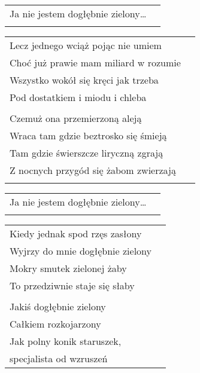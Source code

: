 \documentclass[a5paper]{article}
\begin{document}
\noindent
\begin{tabular}{@{}p{6.50cm}p{3cm}@{}}
Ja nie jestem dogłębnie zielony… \\ \\
\end{tabular}

\noindent
\begin{tabular}{@{}p{7.50cm}p{3cm}@{}}
Lecz jednego wciąż pojąc nie umiem \\
Choć już prawie mam miliard w rozumie \\
Wszystko wokół się kręci jak trzeba \\
Pod dostatkiem i miodu i chleba \\ \\

Czemuż ona przemierzoną aleją \\
Wraca tam gdzie beztrosko się śmieją \\
Tam gdzie świerszcze liryczną zgrają \\
Z nocnych przygód się żabom zwierzają \\ \\
\end{tabular}

\noindent
\begin{tabular}{@{}p{6.50cm}p{3cm}@{}}
Ja nie jestem dogłębnie zielony… \\ \\
\end{tabular}

\noindent
\begin{tabular}{@{}p{7.50cm}p{3cm}@{}}
Kiedy jednak spod rzęs zasłony \\
Wyjrzy do mnie dogłębnie zielony \\
Mokry smutek zielonej żaby \\
To przedziwnie staje się słaby \\ \\

Jakiś dogłębnie zielony \\
Całkiem rozkojarzony \\
Jak polny konik staruszek, \\
specjalista od wzruszeń \\
\end{tabular}
\end{document}
